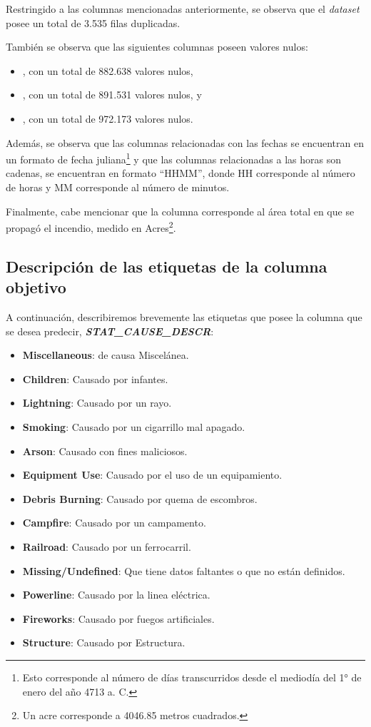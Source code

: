 Restringido a las columnas mencionadas anteriormente, se observa que el \textit{dataset} posee un total de 3.535 filas duplicadas. 

También se observa que las siguientes columnas poseen valores nulos: 
\begin{itemize}
    \item {}, con un total de 882.638 valores nulos,
    \item {}, con un total de 891.531 valores nulos, y
    \item {}, con un total de 972.173 valores nulos.
\end{itemize}

Además, se observa que las columnas relacionadas con las fechas se encuentran en un formato de fecha juliana\footnote{Esto corresponde al número de días transcurridos desde el mediodía del 1° de enero del año 4713 a. C.} y que las columnas relacionadas a las horas son cadenas, se encuentran en formato ``HHMM'', donde HH corresponde al número de horas y MM corresponde al número de minutos.

Finalmente, cabe mencionar que la columna  corresponde al área total en que se propagó el incendio, medido en Acres\footnote{Un acre corresponde a 4046.85 metros cuadrados.}.

\subsection{Descripción de las etiquetas de la columna objetivo}

A continuación, describiremos brevemente las etiquetas que posee la columna que se desea predecir, \textit{\textbf{STAT\_CAUSE\_DESCR}}:
\begin{itemize}
    \item \textbf{Miscellaneous}: de causa Miscelánea.
    \item \textbf{Children}: Causado por infantes.
    \item \textbf{Lightning}: Causado por un rayo.
    \item \textbf{Smoking}: Causado por un cigarrillo mal apagado.
    \item \textbf{Arson}: Causado con fines maliciosos.
    \item \textbf{Equipment Use}: Causado por el uso de un equipamiento.
    \item \textbf{Debris Burning}: Causado por quema de escombros.
    \item \textbf{Campfire}: Causado por un campamento.
    \item \textbf{Railroad}: Causado por un ferrocarril.
    \item \textbf{Missing/Undefined}: Que tiene datos faltantes o que no están definidos.
    \item \textbf{Powerline}: Causado por la linea eléctrica.
    \item \textbf{Fireworks}: Causado por fuegos artificiales.
    \item \textbf{Structure}: Causado por Estructura.
\end{itemize}

